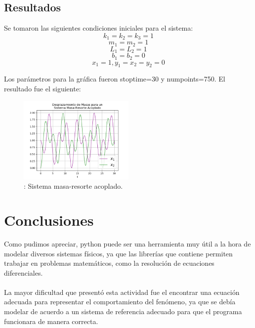 \documentclass[letterpaper,12pt]{article}
\begin{document}
\subsection{Resultados}
 Se tomaron las siguientes condiciones iniciales para el sistema:
 \[k_{1}=k_{2}=k_{3}=1\]
 \[m_{1}=m_{2}=1\] 
 \[L_{1}=L_{2}=1\]
 \[b_{1}=b_{2}=0\] 
 \[x_{1}=1, y_{1}=x_{2}=y_{2}=0\]
 
 Los parámetros para la gráfica fueron stoptime=30 y numpoints=750. El resultado fue el siguiente:

\begin{figure}[H]
\centering
\includegraphics[width=0.5\textwidth]{dos_resortes.png}
\caption{\label{fig:graf1}: Sistema masa-resorte acoplado.}
\end{figure}


\section{Conclusiones}
Como pudimos apreciar, python puede ser una herramienta muy útil a la hora de modelar diversos sistemas físicos, ya que las librerías que contiene permiten trabajar en problemas matemáticos, como la resolución de ecuaciones diferenciales. \\\\
La mayor dificultad que presentó esta actividad fue el encontrar una ecuación adecuada para representar el comportamiento del fenómeno, ya que se debía modelar de acuerdo a un sistema de referencia adecuado para que el programa funcionara de manera correcta.\\\\
\end{document}
